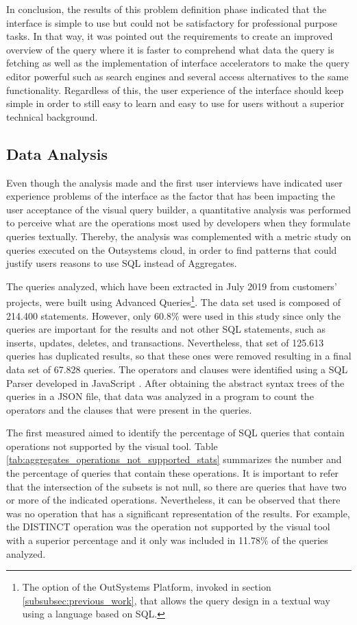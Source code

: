 In conclusion, the results of this problem definition phase indicated that the interface is simple to use but could not be satisfactory for professional purpose tasks. In that way, it was pointed out the requirements to create an improved overview of the query where it is faster to comprehend what data the query is fetching as well as the implementation of interface accelerators to make the query editor powerful such as search engines and several access alternatives to the same functionality. Regardless of this, the user experience of the interface should keep simple in order to still easy to learn and easy to use for users without a superior technical background.

\subsection{Data Analysis}
\label{subsec:data_analysis}

Even though the analysis made and the first user interviews have indicated user experience problems of the interface as the factor that has been impacting the user acceptance of the visual query builder, a quantitative analysis was performed to perceive what are the operations most used by developers when they formulate queries textually. Thereby, the analysis was complemented with a metric study on queries executed on the Outsystems cloud, in order to find patterns that could justify users reasons to use \gls{SQL} instead of Aggregates. 

The queries analyzed, which have been extracted in July 2019 from customers’ projects, were built using Advanced Queries\footnote{The option of the OutSystems Platform, invoked in section \ref{subsubsec:previous_work}, that allows the query design in a textual way using a language based on \gls{SQL}.}. The data set used is composed of 214.400 statements. However, only 60.8\% were used in this study since only the queries are important for the results and not other SQL statements, such as inserts, updates, deletes, and transactions. Nevertheless, that set of 125.613 queries has duplicated results, so that these ones were removed resulting in a final data set of 67.828 queries. The operators and clauses were identified using a \gls{SQL} Parser developed in JavaScript \cite{jsSqlParser}. After obtaining the abstract syntax trees of the queries in a JSON file, that data was analyzed in a program to count the operators and the clauses that were present in the queries. 

The first measured aimed to identify the percentage of \gls{SQL} queries that contain operations not supported by the visual tool. Table \ref{tab:aggregates_operations_not_supported_stats} summarizes the number and the percentage of queries that contain these operations. It is important to refer that the intersection of the subsets is not null, so there are queries that have two or more of the indicated operations. Nevertheless, it can be observed that there was no operation that has a significant representation of the results. For example, the DISTINCT operation was the operation not supported by the visual tool with a superior percentage and it only was included in 11.78\% of the queries analyzed.

